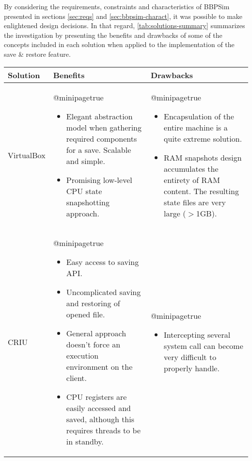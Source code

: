 {By considering the requirements, constraints and characteristics of \gls{BBPSim} presented in sections \ref{sec:reqs} and \ref{sec:bbpsim-charact}, it was possible to make enlightened design decisions. In that regard, \autoref{tab:solutions-summary} summarizes the investigation by presenting the benefits and drawbacks of some of the concepts included in each solution when applied to the implementation of the save \& restore feature.

\begin{table}[htbp]
	\centering
	\begin{tabularx}{\linewidth}{l X X}
		\toprule
		{\bfseries Solution} & {\bfseries\textcolor{benefitsheader}{Benefits}}& {\bfseries\textcolor{drawbacksheader}{Drawbacks}}\\
		\midrule
		VirtualBox &
		\csname @minipagetrue\endcsname 
		\begin{itemize}[leftmargin=*]
			\item Elegant abstraction model when gathering required components for a save. Scalable and simple.
			\item Promising low-level CPU state snapshotting approach.
		\end{itemize} & 
		\csname @minipagetrue\endcsname 
		\begin{itemize}[leftmargin=*]
			\item Encapsulation of the entire machine is a quite extreme solution.
			\item RAM snapshots design accumulates the entirety of RAM content. The resulting state files are very large ($>$1GB).
		\end{itemize}\\
		\midrule
		CRIU & 
		\csname @minipagetrue\endcsname 
		\begin{itemize}[leftmargin=*]
			\item Easy access to saving API.		
			\item Uncomplicated saving and restoring of opened file.
			\item General approach doesn't force an execution environment on the client. 
			\item CPU registers are easily accessed and saved, although this requires threads to be in standby.
		\end{itemize} & 
		\csname @minipagetrue\endcsname 
		\begin{itemize}[leftmargin=*]
			\item Intercepting several system call can become very difficult to properly handle.

\end{itemize}
\end{tabularx}
\end{table}}

